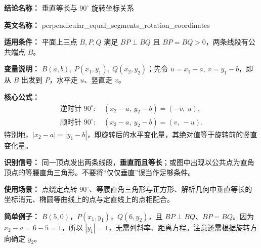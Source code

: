 \textbf{结论名称：} 垂直等长与 $90^\circ$ 旋转坐标关系

\textbf{英文名称：} perpendicular\_equal\_segments\_rotation\_coordinates

\textbf{适用条件：} 平面上三点 $B,P,Q$ 满足 $BP\perp BQ$ 且 $BP=BQ>0$，两条线段有公共端点 $B$。

\textbf{变量说明：} $B(a,b),\ P(x_1,y_1),\ Q(x_2,y_2)$；先令 $u=x_1-a,\ v=y_1-b$，即从 $B$ 出发到 $P$，水平走 $u$、竖直走 $v$。

\textbf{核心公式：}
\[
\boxed{\begin{aligned}
\text{逆时针 }90^\circ:\ &(x_2-a,\ y_2-b)=(-v,\ u),\\
\text{顺时针 }90^\circ:\ &(x_2-a,\ y_2-b)=(v,\ -u).
\end{aligned}}
\]
特别地，$\boxed{|x_2-a|=|y_1-b|}$，即旋转后的水平变化量，其绝对值等于旋转前的竖直变化量。

\textbf{识别信号：} 同一顶点发出两条线段，\textbf{垂直而且等长}；或图中出现以公共点为直角顶点的等腰直角三角形。不要将“仅仅垂直”误当作足够条件。

\textbf{使用场景：} 点绕定点转 $90^\circ$、等腰直角三角形与正方形、解析几何中垂直等长的坐标消元、椭圆等曲线上的点与定直线上的点相配合。

\textbf{简单例子：} $B(5,0)$，$P(x_1,y_1)$，$Q(6,y_2)$，且 $BP\perp BQ$、$BP=BQ$。因为 $x_2-a=6-5=1$，所以 $|y_1|=1$，无需列斜率、距离方程。注意还需根据旋转方向确定 $y_2$。
